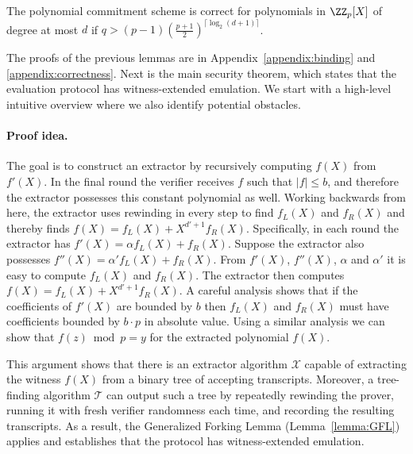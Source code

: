 \newcommand{\correctnesslemma}{
The polynomial commitment scheme is correct for polynomials in $\ZZ_p[X]$ of degree at most $d$ if $q> (p-1) (\frac{p+1}{2})^{\lceil \log_2(d+1)\rceil}$.
}
 
 \begin{lemma}
 	\label{lem:correctness}
\correctnesslemma
 \end{lemma}


The proofs of the previous lemmas are in Appendix~\ref{appendix:binding} and \ref{appendix:correctness}.
Next is the main security theorem, which states that the evaluation protocol has witness-extended emulation. We start with a high-level intuitive overview where we also identify potential obstacles.

\paragraph{Proof idea.} %
The goal is to construct an extractor by recursively computing $f(X)$ from $f'(X)$. In the final round the verifier receives $f$ such that $|f| \leq b$, and therefore the extractor possesses this constant polynomial as well. Working backwards from here, the extractor uses rewinding in every step to find $f_L(X)$ and $f_R(X)$ and thereby finds $f(X) = f_L(X) + X^{d'+1}f_R(X)$.
Specifically, in each round the extractor has $f'(X)=\alpha f_L(X)+ f_R(X)$. Suppose the extractor also possesses $f''(X)=\alpha' f_L(X)+ f_R(X)$. From $f'(X)$, $f''(X)$, $\alpha$ and $\alpha'$ it is easy to compute $f_L(X)$ and $f_R(X)$. The extractor then computes $f(X)=f_L(X)+X^{d'+1} f_R(X)$.
A careful analysis shows that if the coefficients of $f'(X)$ are bounded by $b$ then $f_L(X)$ and $f_R(X)$ must have coefficients bounded by $b \cdot p$ in absolute value. Using a similar analysis we can show that $f(z)\bmod p=y$ for the extracted polynomial $f(X)$.

This argument shows that there is an extractor algorithm $\mathcal{X}$ capable of extracting the witness $f(X)$ from a binary tree of accepting transcripts. Moreover, a tree-finding algorithm $\mathcal{T}$ can output such a tree by repeatedly rewinding the prover, running it with fresh verifier randomness each time, and recording the resulting transcripts. As a result, the Generalized Forking Lemma (Lemma~\ref{lemma:GFL}) applies and establishes that the protocol has witness-extended emulation.

